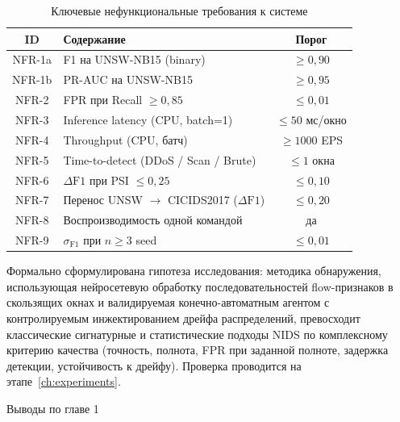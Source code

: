 \begin{table}[H]
\caption{Ключевые нефункциональные требования к системе}
\label{tab:requirements}
\centering
\begin{tabularx}{\linewidth}{|c|Z|c|}
\hline
ID & Содержание & Порог \\
\hline
NFR-1a & F1 на UNSW-NB15 (binary) & $\geq 0{,}90$ \\
\hline
NFR-1b & PR-AUC на UNSW-NB15 & $\geq 0{,}95$ \\
\hline
NFR-2 & FPR при Recall $\geq 0{,}85$ & $\leq 0{,}01$ \\
\hline
NFR-3 & Inference latency (CPU, batch=1) & $\leq 50$ мс/окно \\
\hline
NFR-4 & Throughput (CPU, батч) & $\geq 1000$ EPS \\
\hline
NFR-5 & Time-to-detect (DDoS / Scan / Brute) & $\leq 1$ окна \\
\hline
NFR-6 & $\Delta\text{F1}$ при PSI $\leq 0{,}25$ & $\leq 0{,}10$ \\
\hline
NFR-7 & Перенос UNSW $\to$ CICIDS2017 ($\Delta\text{F1}$) & $\leq 0{,}20$ \\
\hline
NFR-8 & Воспроизводимость одной командой & да \\
\hline
NFR-9 & $\sigma_{\text{F1}}$ при $n \geq 3$ seed & $\leq 0{,}01$ \\
\hline
\end{tabularx}
\end{table}

Формально сформулирована гипотеза исследования: методика
обнаружения, использующая нейросетевую обработку последовательностей
flow-признаков в скользящих окнах и валидируемая конечно-автоматным
агентом с контролируемым инжектированием дрейфа распределений,
превосходит классические сигнатурные и статистические подходы NIDS
по комплексному критерию качества (точность, полнота, FPR при
заданной полноте, задержка детекции, устойчивость к дрейфу).
Проверка проводится на этапе~\ref{ch:experiments}.

\noindent Выводы по главе 1

